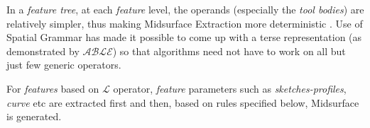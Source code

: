 
In a {\em feature tree}, at each {\em feature} level, the operands (especially the {\em tool bodies}) are relatively simpler, thus making Midsurface Extraction more deterministic \cite{YogeshIITM2013}.  Use of Spatial Grammar has made it possible to come up with a terse representation (as demonstrated by $\mathcal{ABLE}$) so that algorithms need not have to work on all but just few generic operators. 
%
%

For {\em features} based on {\bf $\mathcal{L}$} operator, {\em feature} parameters such as {\em sketches-profiles}, {\em curve} etc are extracted first and then, based on rules specified below, Midsurface is generated.

